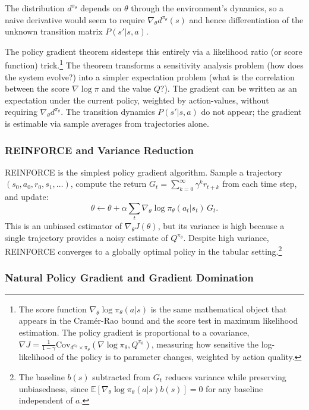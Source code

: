 The distribution $d^{\pi_\theta}$ depends on $\theta$ through the environment's dynamics, so a naive derivative would seem to require $\nabla_\theta d^{\pi_\theta}(s)$ and hence differentiation of the unknown transition matrix $P(s'|s,a)$.

The policy gradient theorem sidesteps this entirely via a likelihood ratio (or score function) trick.\footnote{The score function $\nabla_\theta \log \pi_\theta(a|s)$ is the same mathematical object that appears in the Cram\'er-Rao bound and the score test in maximum likelihood estimation. The policy gradient is proportional to a covariance, $\nabla J = \frac{1}{1-\gamma}\text{Cov}_{d^{\pi_\theta} \times \pi_\theta}(\nabla \log \pi_\theta, Q^{\pi_\theta})$, measuring how sensitive the log-likelihood of the policy is to parameter changes, weighted by action quality.} The theorem transforms a sensitivity analysis problem (how does the system evolve?) into a simpler expectation problem (what is the correlation between the score $\nabla \log \pi$ and the value $Q$?). The gradient can be written as an expectation under the current policy, weighted by action-values, without requiring $\nabla_\theta d^{\pi_\theta}$. The transition dynamics $P(s'|s,a)$ do not appear; the gradient is estimable via sample averages from trajectories alone.

\subsubsection{REINFORCE and Variance Reduction}

REINFORCE \citep{williams1992} is the simplest policy gradient algorithm. Sample a trajectory $(s_0, a_0, r_0, s_1, \ldots)$, compute the return $G_t = \sum_{k=0}^\infty \gamma^k r_{t+k}$ from each time step, and update:
\begin{equation}
\theta \leftarrow \theta + \alpha \sum_t \nabla_\theta \log \pi_\theta(a_t|s_t) \, G_t.
\end{equation}
This is an unbiased estimator of $\nabla_\theta J(\theta)$, but its variance is high because a single trajectory provides a noisy estimate of $Q^{\pi_\theta}$. Despite high variance, REINFORCE converges to a globally optimal policy in the tabular setting.\footnote{The baseline $b(s)$ subtracted from $G_t$ reduces variance while preserving unbiasedness, since $\mathbb{E}[\nabla_\theta \log \pi_\theta(a|s) b(s)] = 0$ for any baseline independent of $a$.}

\subsubsection{Natural Policy Gradient and Gradient Domination}

